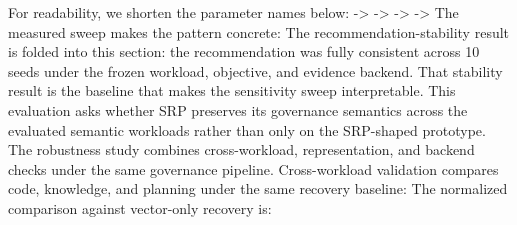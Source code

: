 \markdownRendererUlEndTight \markdownRendererInterblockSeparator
{}For readability, we shorten the parameter names below:\markdownRendererInterblockSeparator
{}\markdownRendererUlBeginTight
\markdownRendererUlItem {} -> \markdownRendererUlItemEnd 
\markdownRendererUlItem {} -> \markdownRendererUlItemEnd 
\markdownRendererUlItem {} -> \markdownRendererUlItemEnd 
\markdownRendererUlItem {} -> \markdownRendererUlItemEnd 
\markdownRendererUlEndTight \markdownRendererInterblockSeparator
{}The measured sweep makes the pattern concrete:\markdownRendererInterblockSeparator
{}\markdownRendererInterblockSeparator
{}The recommendation-stability result is folded into this section: the recommendation was fully consistent across 10 seeds under the frozen workload, objective, and evidence backend. That stability result is the baseline that makes the sensitivity sweep interpretable.\markdownRendererInterblockSeparator
{}
\markdownRendererSectionEnd \markdownRendererSectionBegin
{}\markdownRendererInterblockSeparator
{}This evaluation asks whether SRP preserves its governance semantics across the evaluated semantic workloads rather than only on the SRP-shaped prototype.\markdownRendererParagraphSeparator
{}The robustness study combines cross-workload, representation, and backend checks under the same governance pipeline.\markdownRendererParagraphSeparator
{}Cross-workload validation compares code, knowledge, and planning under the same recovery baseline:\markdownRendererInterblockSeparator
{}\markdownRendererInterblockSeparator
{}The normalized comparison against vector-only recovery is:\markdownRendererInterblockSeparator
{}\markdownRendererInterblockSeparator
